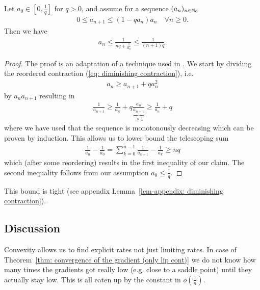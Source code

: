 \begin{lemma}
	\label{lem: upper bound on diminishing contraction}
	Let \(a_0 \in [0, \frac{1}{q}]\) for \(q>0\), and assume for a sequence
	\((a_n)_{n\in\mathbb{N}_0}\)
	\begin{align}\label{eq: diminishing contraction}
		0\le a_{n+1} \le (1-q a_n)a_n \quad \forall n \ge 0.
	\end{align}
	Then we have
	\begin{align*}
		a_n \le \frac{1}{nq + \frac1{a_0}}\le\frac1{(n+1)q}.
	\end{align*}
\end{lemma}
\begin{proof}
	The proof is an adaptation of a technique used in \textcite[Theorem
	2.1.14]{nesterovLecturesConvexOptimization2018}. We start by dividing the
	reordered contraction (\ref{eq: diminishing contraction}), i.e.
	\begin{align*}
		a_n \ge a_{n+1} + qa_n^2
	\end{align*}
	by \(a_na_{n+1}\) resulting in
	\begin{align*}
		\frac1{a_{n+1}}
		\ge \frac1{a_n} + q \underbrace{\frac{a_n}{a_{n+1}}}_{\ge 1}
		\ge \frac1{a_n} + q
	\end{align*}
	where we have used that the sequence is monotonously decreasing which
	can be proven by induction. This allows us to lower bound the telescoping
	sum
	\begin{align*}
		\frac1{a_n} - \frac1{a_0}
		= \sum_{k=0}^{n-1} \frac1{a_{k+1}} - \frac1{a_k}
		\ge nq
	\end{align*}
	which (after some reordering) results in the first inequality of our claim.
	The second inequality follows from our assumption \(a_0 \le \frac{1}{q}\).
\end{proof}
\begin{remark}
	This bound is tight (see appendix Lemma~\ref{lem-appendix: diminishing contraction}).
\end{remark}

\subsection{Discussion}

Convexity allows us to find explicit rates not just limiting rates. In case
of Theorem~\ref{thm: convergence of the gradient (only lip cont)} we do not
know how many times the gradients got really low (e.g. close to a saddle
point) until they actually stay low. This is all eaten up by the
constant in \(o(\tfrac1n)\).

